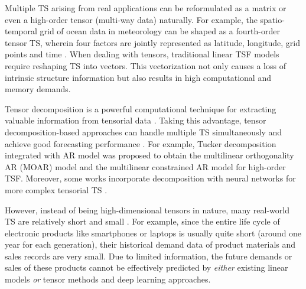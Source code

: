 \documentclass[letterpaper]{article} %
\numberwithin{theorem}{section}
\begin{document}
	Multiple TS arising from real applications  can be reformulated as a matrix or even a high-order  tensor (multi-way data) naturally. For example,  the spatio-temporal grid of ocean data in meteorology can be shaped as  a fourth-order tensor TS, wherein four factors are jointly represented as latitude, longitude, grid points and time \cite{jing2018high}. When
	dealing with tensors, traditional linear TSF models require reshaping  TS into vectors. This vectorization not only  causes a loss of
	intrinsic structure information but also  results in  high computational and memory demands.
	
	Tensor decomposition is a powerful computational technique for extracting valuable information from tensorial data \cite{cichocki2016tensor,shi2018feature,zhou2019probabilistic,zhou2019bayesian}. Taking this advantage, tensor decomposition-based   approaches can handle  multiple   TS simultaneously and achieve good  forecasting performance \cite{dunlavy2011temporal,li2015tensor,tan2016short,bhanu2018forecasting,faloutsos2018forecasting}. 
	For example,   Tucker decomposition  integrated with   AR model was proposed   \cite{jing2018high}     to  obtain    the multilinear orthogonality  AR (MOAR) model and the multilinear constrained AR model for high-order TSF. Moreover, some works incorporate  decomposition with neural networks for more complex  tensorial TS \cite{yu2017long,ma2019large}. 
	
	However, instead of being high-dimensional tensors in nature, many real-world TS are relatively short and small \cite{smyl2016data}.
	For example,  since the entire   life  cycle of    electronic products like smartphones or laptops   is usually  quite short (around one year for each generation),  their  historical demand data of product materials and sales records are   very  small. Due to limited information,    the future demands or sales of these products cannot be effectively predicted  by \textit{either} existing linear models  \textit{or}   tensor methods  and  deep learning approaches. 
	
\end{document}
